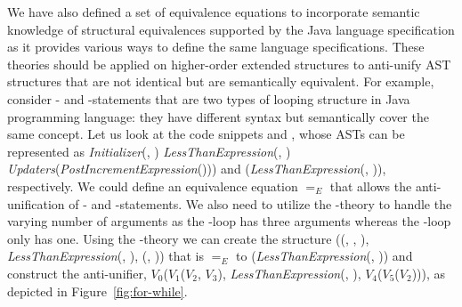 We have also defined a set of equivalence equations to incorporate semantic knowledge of structural equivalences supported by the Java language specification as it provides various ways to define the same language specifications. These theories should be applied on higher-order extended structures to anti-unify AST structures that are not identical but are semantically equivalent. For example, consider - and -statements that are two types of looping structure in Java programming language: they have different syntax but semantically cover the same concept. Let us look at the code snippets  and , whose ASTs can be represented as \textit{Initializer}(, )\code{;} \textit{LessThanExpression}(, )\code{;} \textit{Updaters}(\textit{PostIncrementExpression}())) and (\textit{LessThanExpression}(, )), respectively. We could define an equivalence equation $=_E$ that allows the anti-unification of - and -statements. We also need to utilize the \NIL{}-theory to handle the varying number of arguments as the -loop has three arguments whereas the -loop only has one. Using the \NIL{}-theory we can create the structure (\NIL{}(\NIL{}, \NIL{}, \NIL{}), \textit{LessThanExpression}(, ), \NIL{}(\NIL{}, \NIL{})) that is $=_E$ to (\textit{LessThanExpression}(, )) and construct the anti-unifier, $V_0$($V_1$($V_2$, $V_3$), \textit{LessThanExpression}(, ), $V_4$($V_5$($V_2$))), as depicted in Figure~\ref{fig:for-while}.

